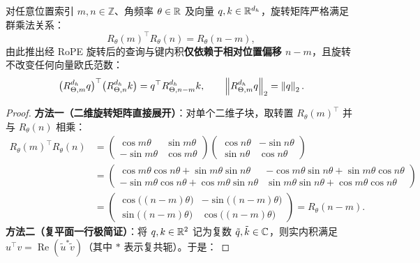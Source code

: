 \begin{thmBox}
\begin{theorem}
\label{thm:rope}
对任意位置索引 $m, n \in \mathbb{Z}$、角频率 $\theta \in \mathbb{R}$ 及向量 $q, k \in \mathbb{R}^{d_h}$，旋转矩阵严格满足群乘法关系：
\begin{equation}
  R_\theta(m)^\top R_\theta(n) = R_\theta(n - m),
  \label{eq:rope-group}
\end{equation}
由此推出经 RoPE 旋转后的查询与键内积\textbf{仅依赖于相对位置偏移 $n - m$}，且旋转不改变任何向量欧氏范数：
\begin{equation}
  \big(R_{\Theta, m}^{d_h} q\big)^\top \big(R_{\Theta, n}^{d_h} k\big)
  = q^\top R_{\Theta, n - m}^{d_h} k,
  \qquad
  \left\|R_{\Theta, m}^{d_h} q\right\|_2 = \left\|q\right\|_2.
  \label{eq:rope-rel}
\end{equation}
\end{theorem}
\begin{proof}
\textbf{方法一（二维旋转矩阵直接展开）}：对单个二维子块，取转置 $R_\theta(m)^\top$ 并与 $R_\theta(n)$ 相乘：
\begin{align*}
  R_\theta(m)^\top R_\theta(n)
  &= \begin{pmatrix}
    \cos m\theta & \sin m\theta \\
    -\sin m\theta & \cos m\theta
  \end{pmatrix}
  \begin{pmatrix}
    \cos n\theta & -\sin n\theta \\
    \sin n\theta & \cos n\theta
  \end{pmatrix} \\
  &= \begin{pmatrix}
    \cos m\theta \cos n\theta + \sin m\theta \sin n\theta &
    -\cos m\theta \sin n\theta + \sin m\theta \cos n\theta \\
    -\sin m\theta \cos n\theta + \cos m\theta \sin n\theta &
    \sin m\theta \sin n\theta + \cos m\theta \cos n\theta
  \end{pmatrix} \\
  &= \begin{pmatrix}
    \cos\big((n - m)\theta\big) & -\sin\big((n - m)\theta\big) \\
    \sin\big((n - m)\theta\big) & \cos\big((n - m)\theta\big)
  \end{pmatrix}
  = R_\theta(n - m).
\end{align*}
\textbf{方法二（复平面一行极简证）}：将 $q, k \in \mathbb{R}^2$ 记为复数 $\tilde{q}, \tilde{k} \in \mathbb{C}$，则实内积满足 $u^\top v = \operatorname{Re}(\tilde{u}^* \tilde{v})$（其中 $*$ 表示复共轭）。于是：

\end{proof}
\end{thmBox}
